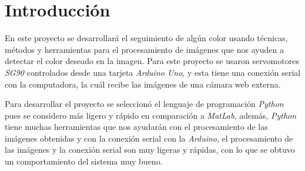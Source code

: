 \documentclass[12pt, oneside]{article}
\begin{document}
\section{Introducción}
{\sffamily\large\justify
    \hspace{0.5cm} En este proyecto se desarrollará el seguimiento de algún color usando
    técnicas, métodos y herramientas para el procesamiento de imágenes que nos ayuden a
    detectar el color deseado en la imagen. Para este proyecto se usaron servomotores
    \emph{SG90} controlados desde una tarjeta \emph{Arduino Uno}, y esta tiene una
    conexión serial con la computadora, la cuál recibe las imágenes de una cámara web
    externa.

    \hspace{0.5cm} Para desarrollar el proyecto se seleccionó el lenguaje de
    programación \emph{Python} pues se considero más ligero y rápido en comparación a
    \emph{MatLab}, además, \emph{Python} tiene muchas herramientas que nos ayudarán con
    el procesamiento de las imágenes obtenidas y con la conexión serial con la
    \emph{Arduino}, el procesamiento de las imágenes y la conexión serial son muy
    ligeras y rápidas, con lo que se obtuvo un comportamiento del sistema muy bueno.

}
\end{document}
